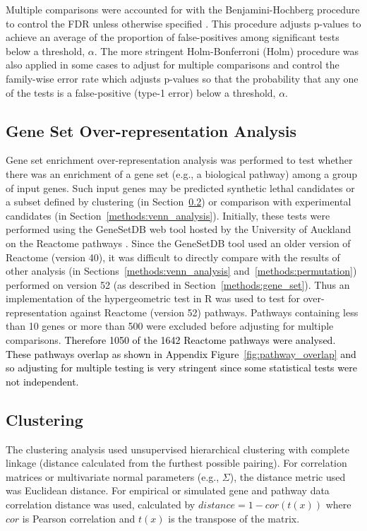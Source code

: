 Multiple comparisons were accounted for with the Benjamini-Hochberg procedure to control the \gls{FDR} unless otherwise specified \citep{fdr1995}. This procedure adjusts p-values to achieve an average of the proportion of false-positives among significant tests below a threshold, $\alpha$. The more stringent Holm-Bonferroni (Holm) procedure \citep{Holm1979} was also applied in some cases to adjust for multiple comparisons and control the family-wise error rate which adjusts p-values so that the probability that any one of the tests is a false-positive (type-1 error) below a threshold, $\alpha$.

\subsection{Gene Set Over-representation Analysis} \label{methods:enrichment}
Gene set enrichment over-representation analysis was performed to test whether there was an enrichment of a gene set (e.g., a biological \gls{pathway}) among a group of input genes. Such input genes may be predicted \gls{synthetic lethal} candidates or a subset defined by clustering (in Section~\ref{methods:clustering}) or comparison with experimental candidates (in Section~\ref{methods:venn_analysis}). Initially, these tests were performed using the GeneSetDB web tool \citep{genesetdb} hosted by the University of Auckland on the Reactome \glspl{pathway} \citep{Reactome}. Since the GeneSetDB tool used an older version of Reactome (version 40), it was difficult to directly compare with the results of other analysis (in Sections~\ref{methods:venn_analysis} and~\ref{methods:permutation}) performed on version 52 (as described in  Section~\ref{methods:gene_set}). Thus an implementation of the hypergeometric test in R \citep{R_core} was used to test for over-representation against Reactome (version 52) \glspl{pathway}. Pathways containing less than 10 genes or more than 500 \citep[as performed in GeneSetDB by][]{genesetdb} were excluded before adjusting for multiple comparisons. \textcolor{black}{Therefore 1050 of the 1642 Reactome pathways were analysed.} \textcolor{black}{These pathways overlap as shown in Appendix Figure~\ref{fig:pathway_overlap} and so adjusting for multiple testing is very stringent since some statistical tests were not independent.} 

\subsection{Clustering} \label{methods:clustering}
The clustering analysis used unsupervised hierarchical clustering with complete linkage (distance calculated from the furthest possible pairing). For correlation matrices or multivariate normal parameters (e.g., $\Sigma$), the distance metric used was Euclidean distance. For empirical or simulated gene and \gls{pathway}  data correlation distance was used, calculated by $distance = 1 - cor(t(x))$ where $cor$ is Pearson correlation and $t(x)$ is the transpose of the  matrix. 

